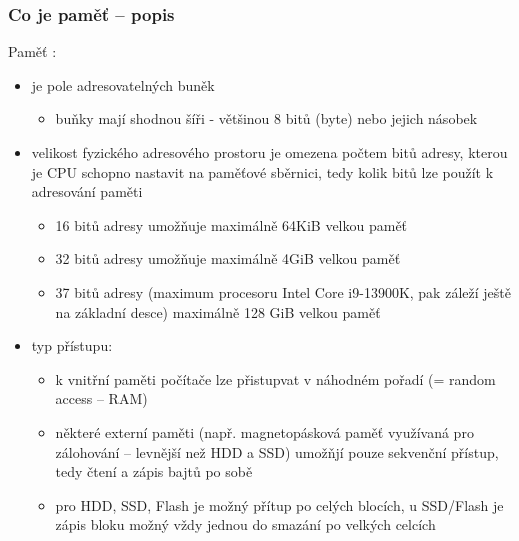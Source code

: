 \documentclass{beamer}
\begin{document}
\begin{frame}
\frametitle{Co je paměť -- popis}

Paměť :
\begin{itemize}
\item je pole adresovatelných buněk
\begin{itemize}
\item buňky mají shodnou šíři - většinou 8 bitů (byte) nebo jejich násobek
\end{itemize}
\item velikost fyzického adresového prostoru je omezena počtem bitů adresy, kterou je CPU schopno nastavit na paměťové sběrnici, tedy kolik bitů lze použít k adresování paměti
\begin{itemize}
\item 16 bitů adresy umožňuje maximálně 64KiB velkou paměť
\item 32 bitů adresy umožňuje maximálně 4GiB velkou paměť
\item 37 bitů adresy (maximum procesoru Intel Core  i9-13900K, pak záleží ještě na základní desce) maximálně 128 GiB velkou paměť
\end{itemize}
\item typ přístupu:
\begin{itemize}
\item k vnitřní paměti počítače lze přistupvat v náhodném pořadí (= random access -- RAM)
\item některé externí paměti (např. magnetopásková paměť využívaná pro zálohování -- levnější než HDD a SSD) umožňjí pouze sekvenční přístup, tedy čtení a zápis bajtů po sobě
\item pro HDD, SSD, Flash je možný přítup po celých blocích, u SSD/Flash je zápis bloku možný vždy jednou do smazání po velkých celcích
\end{itemize}
\end{itemize}

\end{frame}
\end{document}
